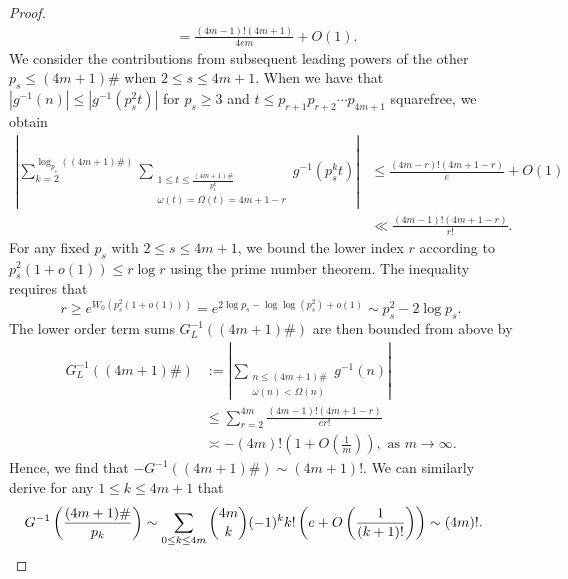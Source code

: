\documentclass[11pt,reqno,a4letter]{article}
\numberwithin{figure}{section}
\numberwithin{table}{section}
\theoremstyle{plain}
\numberwithin{theorem}{section}
\theoremstyle{definition}
\begin{document}
\begin{proof}
\begin{align*}
     & = \frac{(4m-1)! (4m+1)}{4 e m} + O(1). 
\end{align*} 
We consider the contributions from subsequent leading powers of the other 
$p_s \leq (4m+1)\#$ when $2 \leq s \leq 4m+1$. When we have that 
$|g^{-1}(n)| \leq |g^{-1}(p_s^2 t)|$ for $p_s \geq 3$ and 
$t \leq p_{r+1} p_{r+2} \cdots p_{4m+1}$ squarefree, we obtain 
\begin{align*}
\left\lvert \sum_{k=2}^{\log_{p_s}\left((4m+1)\#\right)} 
     \sum_{\substack{1 \leq t \leq \frac{(4m+1)\#}{p_1^k} \\ \omega(t)=\Omega(t)=4m+1-r}} 
     g^{-1}(p_s^k t) \right\rvert & \leq 
     \frac{(4m-r)! (4m+1-r)}{e} + O(1) \\ 
     & \ll \frac{(4m-1)! (4m+1-r)}{r!}. 
\end{align*}
For any fixed $p_s$ with $2 \leq s \leq 4m+1$, we bound the lower 
index $r$ according to $p_s^2 (1+o(1)) \leq r \log r$ using the prime number theorem. 
The inequality requires that 
\[
r \geq e^{W_0(p_s^2(1+o(1)))} = e^{2\log p_s-\log\log(p_s^2) + o(1)} \sim p_s^2 - 2 \log p_s. 
\]
The lower order term sums $G_L^{-1}((4m+1)\#)$ are then bounded from above by 
\begin{align*} 
G_L^{-1}((4m+1)\#) & := \left\lvert 
     \sum_{\substack{n \leq (4m+1)\# \\ \omega(n)<\Omega(n)}} g^{-1}(n) 
     \right\rvert \\ 
     & \leq \sum_{r=2}^{4m} \frac{(4m-1)! (4m+1-r)}{e r!} \\ 
     & \asymp -(4m)! \left(1 + O\left(\frac{1}{m}\right)\right), 
     \text{ as } m \rightarrow \infty. 
\end{align*} 
Hence, we find that $-G^{-1}((4m+1)\#) \sim (4m+1)!$. 
We can similarly derive for any $1 \leq k \leq 4m+1$ that 
\begin{align*}
G^{-1}\left(\frac{(4m+1)\#}{p_k}\right) & \sim \sum_{0 \leq k \leq 4m} \binom{4m}{k} (-1)^{k} k! 
     \left(e + O\left(\frac{1}{(k+1)!}\right)\right) \sim (4m)!. 
     \qedhere 
\end{align*}
\end{proof}
\end{document}
